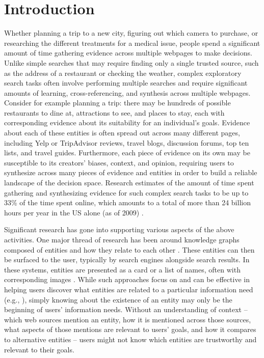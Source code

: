 \section{Introduction}

Whether planning a trip to a new city, figuring out which camera to purchase, or researching the different treatments for a medical issue, people spend a significant amount of time gathering evidence across multiple webpages to make decisions. Unlike simple searches that may require finding only a single trusted source, such as the address of a restaurant or checking the weather, complex exploratory search tasks often involve performing multiple searches and require significant amounts of learning, cross-referencing, and synthesis across multiple webpages. Consider for example planning a trip: there may be hundreds of possible restaurants to dine at, attractions to see, and places to stay, each with corresponding evidence about its suitability for an individual's goals. Evidence about each of these entities is often spread out across many different pages, including Yelp or TripAdvisor reviews, travel blogs, discussion forums, top ten lists, and travel guides. Furthermore, each piece of evidence on its own may be susceptible to its creators' biases, context, and opinion, requiring users to synthesize across many pieces of evidence and entities in order to build a reliable landscape of the decision space. Research estimates of the amount of time spent gathering and synthesizing evidence for such complex search tasks to be up to 33\% of the time spent online, which amounts to a total of more than 24 billion hours per year in the US alone (as of 2009) \cite{mar2006exp,kellar2007field,rose2004understanding,forrester}.

Significant research has gone into supporting various aspects of the above activities. One major thread of research has been around knowledge graphs composed of entities and how they relate to each other \cite{dbpedia}. These entities can then be surfaced to the user, typically by search engines alongside search results. In these systems, entities are presented as a card or a list of names, often with corresponding images \cite{bota}. While such approaches focus on and can be effective in helping users discover what entities are related to a particular information need (e.g., \cite{miliaraki2015selena}), simply knowing about the existence of an entity may only be the beginning of users' information needs. Without an understanding of context -- which web sources mention an entity, how it is mentioned across those sources, what aspects of those mentions are relevant to users' goals, and how it compares to alternative entities -- users might not know which entities are trustworthy and relevant to their goals.

